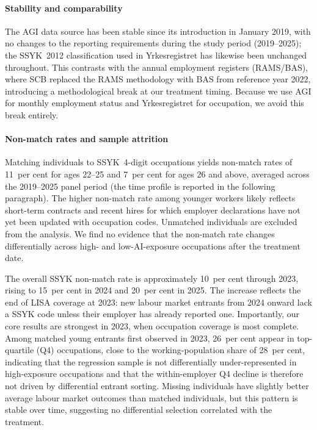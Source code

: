 \documentclass[preprint,12pt,authoryear]{elsarticle}
\begin{document}
\paragraph{Stability and comparability}
The AGI data source has been stable since its introduction in January 2019, with no changes to the reporting requirements during the study period (2019--2025); the SSYK~2012 classification used in Yrkesregistret has likewise been unchanged throughout. This contrasts with the annual employment registers (RAMS/BAS), where SCB replaced the RAMS methodology with BAS from reference year 2022, introducing a methodological break at our treatment timing. Because we use AGI for monthly employment status and Yrkesregistret for occupation, we avoid this break entirely.

\paragraph{Non-match rates and sample attrition}
Matching individuals to SSYK~4-digit occupations yields non-match rates of 11~per cent for ages 22--25 and 7~per cent for ages 26 and above, averaged across the 2019--2025 panel period (the time profile is reported in the following paragraph). The higher non-match rate among younger workers likely reflects short-term contracts and recent hires for which employer declarations have not yet been updated with occupation codes. Unmatched individuals are excluded from the analysis. We find no evidence that the non-match rate changes differentially across high- and low-AI-exposure occupations after the treatment date.

The overall SSYK non-match rate is approximately 10~per cent through 2023, rising to 15~per cent in 2024 and 20~per cent in 2025. The increase reflects the end of LISA coverage at 2023: new labour market entrants from 2024 onward lack a SSYK code unless their employer has already reported one. Importantly, our core results are strongest in 2023, when occupation coverage is most complete. Among matched young entrants first observed in 2023, 26~per cent appear in top-quartile (Q4) occupations, close to the working-population share of 28~per cent, indicating that the regression sample is not differentially under-represented in high-exposure occupations and that the within-employer Q4 decline is therefore not driven by differential entrant sorting. Missing individuals have slightly better average labour market outcomes than matched individuals, but this pattern is stable over time, suggesting no differential selection correlated with the treatment.
\end{document}
